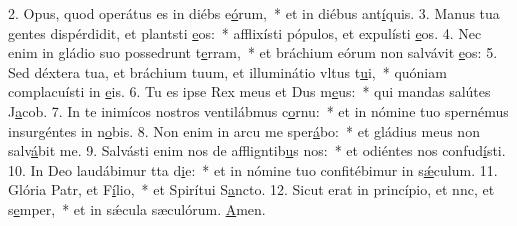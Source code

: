 2. Opus, quod operátus es in diébs e\uline{ó}rum,~* et in diébus ant\uline{í}quis.
3. Manus tua gentes dispérdidit, et plantsti \uline{e}os:~* afflixísti pópulos, et expulísti \uline{e}os.
4. Nec enim in gládio suo possedrunt t\uline{e}rram,~* et bráchium eórum non salvávit \uline{e}os:
5. Sed déxtera tua, et bráchium tuum, et illuminátio vltus t\uline{u}i,~* quóniam complacuísti in \uline{e}is.
6. Tu es ipse Rex meus et Dus m\uline{e}us:~* qui mandas salútes J\uline{a}cob.
7. In te inimícos nostros ventilábmus c\uline{o}rnu:~* et in nómine tuo spernémus insurgéntes in n\uline{o}bis.
8. Non enim in arcu me sper\uline{á}bo:~* et gládius meus non salv\uline{á}bit me.
9. Salvásti enim nos de affligntib\uline{u}s nos:~* et odiéntes nos confud\uline{í}sti.
10. In Deo laudábimur tta d\uline{i}e:~* et in nómine tuo confitébimur in s\uline{ǽ}culum.
11. Glória Patr, et F\uline{í}lio,~* et Spirítui S\uline{a}ncto.
12. Sicut erat in princípio, et nnc, et s\uline{e}mper,~* et in sǽcula sæculórum. \uline{A}men.
